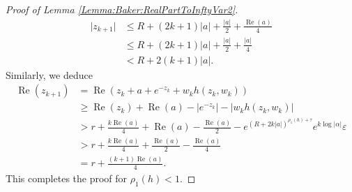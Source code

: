\documentclass[10pt,a4paper]{amsart}
\renewcommand{\Re}{\operatorname{Re}}
\begin{document}
\begin{proof}[Proof of Lemma {\ref{Lemma:Baker:RealPartToInftyVar2}}]
	\begin{equation*}
		\begin{split}
			\lvert z_{k+1} \rvert &\leq R + (2k + 1) \lvert a \rvert +  \frac{\lvert a \rvert}{2} + \frac{\Re(a)}{4} \\
			&\leq R + (2k + 1) \lvert a \rvert +  \frac{\lvert a \rvert}{2} + \frac{\lvert a \rvert}{4}\\
			&< R + 2(k+1) \lvert a \rvert.
		\end{split}
	\end{equation*}
	Similarly, we deduce
	\begin{equation*}
		\begin{split}
			\Re(z_{k+1}) &= \Re\left( z_k + a + e^{-z_k} + w_k h(z_k, w_k) \right) \\
			&\geq \Re(z_k) + \Re(a) - \left\lvert e^{-z_k} \right\rvert - \lvert w_k h(z_k, w_k) \rvert \\
			&> r + \frac{k\Re(a)}{4} + \Re(a) - \frac{\Re(a)}{2}  - e^{(R + 2k \lvert a \rvert)^{\rho_1(h) + \tau}} e^{k  \log \lvert \alpha \rvert} \varepsilon\\
			&> r + \frac{k\Re(a)}{4} + \frac{\Re(a)}{2} - \frac{\Re(a)}{4}\\
			&= r + \frac{(k+1)\Re(a)}{4}.
		\end{split}
	\end{equation*}
	This completes the proof for $\rho_1(h) < 1$.
	

\end{proof}
\end{document}
